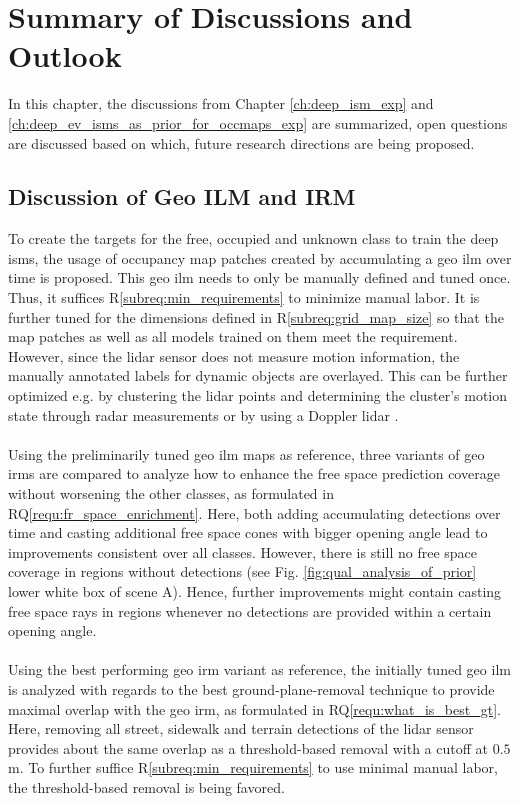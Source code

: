 \chapter{Summary of Discussions and Outlook}
\label{ch:discussion_of_req_n_rq}
In this chapter, the discussions from Chapter \ref{ch:deep_ism_exp} and \ref{ch:deep_ev_isms_as_prior_for_occmaps_exp} are summarized, open questions are discussed based on which, future research directions are being proposed.
%
\section{Discussion of Geo ILM and IRM}
\label{sec:disc_of_geo_ilm_n_irm}
To create the targets for the free, occupied and unknown class to train the deep \gls{ism}s, the usage of occupancy map patches created by accumulating a geo \gls{ilm} over time is proposed. This geo \gls{ilm} needs to only be manually defined and tuned once. Thus, it suffices R\ref{subreq:min_requirements} to minimize manual labor. It is further tuned for the dimensions defined in R\ref{subreq:grid_map_size} so that the map patches as well as all models trained on them meet the requirement. However, since the lidar sensor does not measure motion information, the manually annotated labels for dynamic objects are overlayed. This can be further optimized e.g. by clustering the lidar points and determining the cluster's motion state through radar measurements or by using a Doppler lidar \cite{ma2019moving}.
\\\\
Using the preliminarily tuned geo \gls{ilm} maps as reference, three variants of geo \gls{irm}s are compared to analyze how to enhance the free space prediction coverage without worsening the other classes, as formulated in RQ\ref{requ:fr_space_enrichment}. Here, both adding accumulating detections over time and casting additional free space cones with bigger opening angle lead to improvements consistent over all classes. However, there is still no free space coverage in regions without detections (see Fig. \ref{fig:qual_analysis_of_prior} lower white box of scene A). Hence, further improvements might contain casting free space rays in regions whenever no detections are provided within a certain opening angle.
\\\\
Using the best performing geo \gls{irm} variant as reference, the initially tuned geo \gls{ilm} is analyzed with regards to the best ground-plane-removal technique to provide maximal overlap with the geo \gls{irm}, as formulated in RQ\ref{requ:what_is_best_gt}. Here, removing all street, sidewalk and terrain detections of the lidar sensor provides about the same overlap as a threshold-based removal with a cutoff at $0.5$ m. To further suffice R\ref{subreq:min_requirements} to use minimal manual labor, the threshold-based removal is being favored.
%
